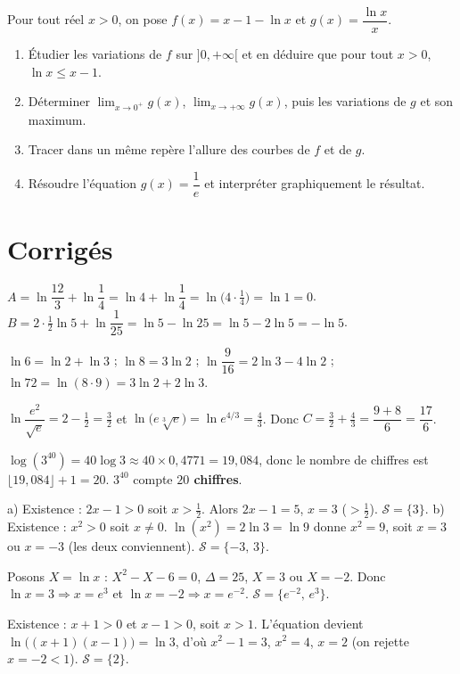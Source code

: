 Pour tout réel $x>0$, on pose $f(x)=x-1-\ln x$ et $g(x)=\dfrac{\ln x}{x}$.
\begin{enumerate}[label=\arabic*)]
\item Étudier les variations de $f$ sur $]0,+\infty[$ et en déduire que pour tout $x>0$,
$\ln x\le x-1$.
\item Déterminer $\displaystyle\lim_{x\to0^{+}}g(x)$, $\displaystyle\lim_{x\to+\infty}g(x)$,
puis les variations de $g$ et son maximum.
\item Tracer dans un même repère l'allure des courbes de $f$ et de $g$.
\item Résoudre l'équation $g(x)=\dfrac1e$ et interpréter graphiquement le résultat.
\end{enumerate}

\section{Corrigés}

$A=\ln\dfrac{12}{3}+\ln\dfrac14=\ln 4+\ln\dfrac14=\ln\big(4\cdot\tfrac14\big)=\ln 1=0$.\;
$B=2\cdot\tfrac12\ln5+\ln\dfrac1{25}=\ln5-\ln25=\ln5-2\ln5=-\ln5$.

$\ln6=\ln2+\ln3$ ; $\ln8=3\ln2$ ; $\ln\dfrac9{16}=2\ln3-4\ln2$ ;
$\ln72=\ln(8\cdot9)=3\ln2+2\ln3$.

$\ln\dfrac{e^{2}}{\sqrt e}=2-\tfrac12=\tfrac32$ et $\ln\big(e\sqrt[3]{e}\big)=\ln e^{4/3}
=\tfrac43$. Donc $C=\tfrac32+\tfrac43=\dfrac{9+8}{6}=\dfrac{17}{6}$.

$\log(3^{40})=40\log3\approx40\times0{,}4771=19{,}084$, donc le nombre de chiffres est
$\lfloor19{,}084\rfloor+1=20$. $3^{40}$ compte \textbf{$20$ chiffres}.

a) Existence : $2x-1>0$ soit $x>\tfrac12$. Alors $2x-1=5$, $x=3$ ($>\tfrac12$).
$\mathcal S=\{3\}$.\;
b) Existence : $x^{2}>0$ soit $x\ne0$. $\ln(x^{2})=2\ln 3=\ln 9$ donne $x^{2}=9$, soit
$x=3$ ou $x=-3$ (les deux conviennent). $\mathcal S=\{-3,\,3\}$.

Posons $X=\ln x$ : $X^{2}-X-6=0$, $\Delta=25$, $X=3$ ou $X=-2$. Donc $\ln x=3\Rightarrow
x=e^{3}$ et $\ln x=-2\Rightarrow x=e^{-2}$. $\mathcal S=\{e^{-2},\,e^{3}\}$.

Existence : $x+1>0$ et $x-1>0$, soit $x>1$. L'équation devient
$\ln\big((x+1)(x-1)\big)=\ln3$, d'où $x^{2}-1=3$, $x^{2}=4$, $x=2$ (on rejette $x=-2<1$).
$\mathcal S=\{2\}$.

